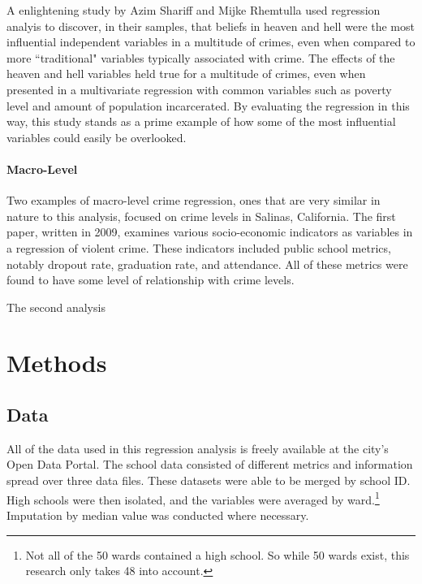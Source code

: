 \documentclass[12pt]{article}
\begin{document}
\par

A enlightening study by Azim Shariff and Mijke Rhemtulla used regression analyis to discover, in their samples, that beliefs in heaven and hell were the most influential independent variables in a multitude of crimes, even when compared to more ``traditional" variables typically associated with crime.\cite{shariff}  The effects of the heaven and hell variables held true for a multitude of crimes, even when presented in a multivariate regression with common variables such as poverty level and amount of population incarcerated.  By evaluating the regression in this way, this study stands as a prime example of how some of the most influential variables could easily be overlooked.

\paragraph{Macro-Level}

Two examples of macro-level crime regression, ones that are very similar in nature to this analysis, focused on crime levels in Salinas, California.  The first paper, written in 2009, examines various socio-economic indicators as variables in a regression of violent crime.  These indicators included public school metrics, notably dropout rate, graduation rate, and attendance.  All of these metrics were found to have some level of relationship with crime levels.\cite{salinas_env}

\par

The second analysis 

	\section{Methods}


\subsection{Data}

All of the data used in this regression analysis is freely available at the city's Open Data Portal.\cite{c1data}\cite{c2data}\cite{s1data}\cite{s2data}\cite{s3data}  The school data consisted of different metrics and information spread over three data files.  These datasets were able to be merged by school ID.  High schools were then isolated, and the variables were averaged by ward.\footnote{Not all of the 50 wards contained a high school.  So while 50 wards exist, this research only takes 48 into account.}  Imputation by median value was conducted where necessary.
\end{document}
